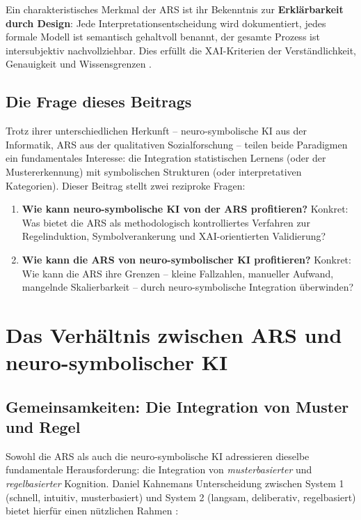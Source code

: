 \documentclass[12pt,a4paper]{article}
\begin{document}
Ein charakteristisches Merkmal der ARS ist ihr Bekenntnis zur \textbf{Erklärbarkeit 
durch Design}: Jede Interpretationsentscheidung wird dokumentiert, jedes formale 
Modell ist semantisch gehaltvoll benannt, der gesamte Prozess ist intersubjektiv 
nachvollziehbar. Dies erfüllt die XAI-Kriterien der Verständlichkeit, Genauigkeit 
und Wissensgrenzen \citep{ortigossa2024xai}.

\subsection{Die Frage dieses Beitrags}

Trotz ihrer unterschiedlichen Herkunft – neuro-symbolische KI aus der Informatik, 
ARS aus der qualitativen Sozialforschung – teilen beide Paradigmen ein fundamentales 
Interesse: die Integration statistischen Lernens (oder der Mustererkennung) mit 
symbolischen Strukturen (oder interpretativen Kategorien). Dieser Beitrag stellt 
zwei reziproke Fragen:

\begin{enumerate}
    \item \textbf{Wie kann neuro-symbolische KI von der ARS profitieren?} Konkret: 
    Was bietet die ARS als methodologisch kontrolliertes Verfahren zur Regelinduktion, 
    Symbolverankerung und XAI-orientierten Validierung?
    
    \item \textbf{Wie kann die ARS von neuro-symbolischer KI profitieren?} Konkret: 
    Wie kann die ARS ihre Grenzen – kleine Fallzahlen, manueller Aufwand, mangelnde 
    Skalierbarkeit – durch neuro-symbolische Integration überwinden?
\end{enumerate}

\section{Das Verhältnis zwischen ARS und neuro-symbolischer KI}

\subsection{Gemeinsamkeiten: Die Integration von Muster und Regel}

Sowohl die ARS als auch die neuro-symbolische KI adressieren dieselbe fundamentale 
Herausforderung: die Integration von \textit{musterbasierter} und \textit{regelbasierter} 
Kognition. Daniel Kahnemans Unterscheidung zwischen System 1 (schnell, intuitiv, 
musterbasiert) und System 2 (langsam, deliberativ, regelbasiert) bietet hierfür 
einen nützlichen Rahmen \citep{kahneman2011thinking}:
\end{document}
